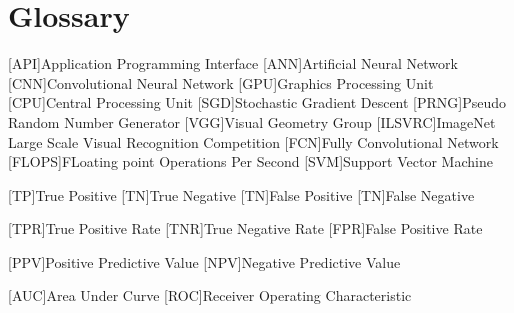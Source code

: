 \chapter{Glossary}

\footnotesize
\SingleSpacing

\begin{multicols}{2}
\begin{acronym}[AAAAAA]

	[API]{Application Programming Interface}
	[ANN]{Artificial Neural Network}
	[CNN]{Convolutional Neural Network}
	[GPU]{Graphics Processing Unit}
	[CPU]{Central Processing Unit}
	[SGD]{Stochastic Gradient Descent}
	[PRNG]{Pseudo Random Number Generator}
	[VGG]{Visual Geometry Group}
    [ILSVRC]{ImageNet Large Scale Visual Recognition Competition}
    [FCN]{Fully Convolutional Network}
    [FLOPS]{FLoating point Operations Per Second}
    [SVM]{Support Vector Machine}

    [TP]{True Positive}
    [TN]{True Negative}
    [TN]{False Positive}
    [TN]{False Negative}

    [TPR]{True Positive Rate}
    [TNR]{True Negative Rate}
    [FPR]{False Positive Rate}

    [PPV]{Positive Predictive Value}
    [NPV]{Negative Predictive Value}

    [AUC]{Area Under Curve}
    [ROC]{Receiver Operating Characteristic}

\end{acronym}
\end{multicols}
